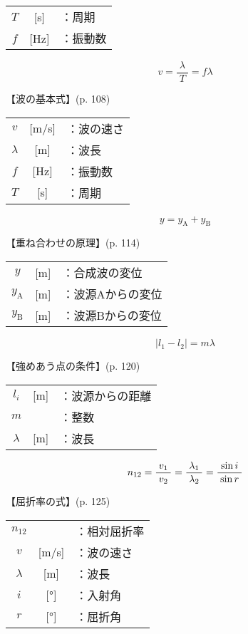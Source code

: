 \documentclass[10pt]{jarticle}
\begin{document}
\begin{tabular}{ccl}
$T$	&[s]	&：周期 \\
$f$	& [Hz]	&：振動数
\end{tabular}

\newpage



\[
v = \frac{\lambda}{\; T \;} = f \lambda
\]


\vskip3mm
【波の基本式】{\footnotesize (p. 108)}

\begin{tabular}{ccl}
$v$	& [m/s]	&：波の速さ\\
$\lambda$	& [m]	&：波長\\
$f$	& [Hz]	&：振動数\\
$T$	&[s]	&：周期
\end{tabular}

\newpage




\[
y = y_\mathrm{A} + y_\mathrm{B}
\]


\vskip3mm
【重ね合わせの原理】{\footnotesize (p. 114)}

\begin{tabular}{ccl}
$y$	& [m]	&：合成波の変位\\
$y_\mathrm{A}$	& [m]	&：波源Aからの変位\\
$y_\mathrm{B}$	& [m]	&：波源Bからの変位
\end{tabular}

\newpage


\[
| l_1 - l_2 |= m \lambda
\]


\vskip3mm
【強めあう点の条件】{\footnotesize (p. 120)}

\begin{tabular}{ccl}
$l_i$	& [m]	&：波源からの距離\\
$m$	& 	&：整数\\
$\lambda$	& [m]	&：波長
\end{tabular}

\newpage




\[
n_{12}	= \frac{v_1}{\; v_2 \;}
	= \frac{\lambda_1}{\; \lambda_2 \;}
	= \frac{\sin i}{\; \sin r \;} \\
\]


\vskip3mm
【屈折率の式】{\footnotesize (p. 125)}

\begin{tabular}{ccl}
$n_{12}$	&	&：相対屈折率\\
$v$	& [m/s]	&：波の速さ\\
$\lambda$	&[m]	&：波長\\
$i$	&[°]	&：入射角\\
$r$	&[°]	&：屈折角\\
\end{tabular}
\end{document}
